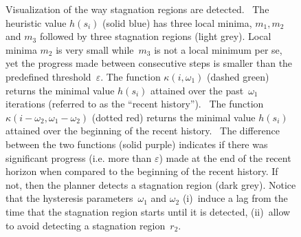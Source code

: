 \documentclass[conference]{IEEEtran}
\begin{document}
\begin{figure}[t]
{  }
  \caption{%
    Visualization of the way stagnation regions are detected.   
	~The heuristic value $h(s_i)$ (solid blue) has three local minima, $m_1, m_2$ and $m_3$ followed by three stagnation regions (light grey). Local minima $m_2$ is very small while~$m_3$ is not a local minimum per se, yet the progress made between consecutive steps is smaller than the predefined threshold~$\varepsilon$.
	The function $\kappa(i,\omega_1)$ (dashed green) returns the minimal value $h(s_i)$ attained over the past~$\omega_1$ iterations (referred to  as the ``recent history'').
    ~The function $\kappa(i-\omega_2,\omega_1-\omega_2)$ (dotted red) returns the minimal value $h(s_i)$ attained over the beginning of the recent history.
    ~The difference between the two functions (solid purple) indicates if there was significant progress (i.e. more than $\varepsilon$) made at the end of the recent horizon when compared to the beginning of the recent history. 
    If not, then the planner detects a stagnation region (dark grey).
		Notice that the hysteresis parameters~$\omega_1$ and $\omega_2$ 
		(i)~induce a lag from the time that the stagnation region starts until it is detected,
		(ii)~allow to avoid detecting a stagnation region~$r_2$.  
		}%

  \label{fig:filmstrip-local-min}%

  \vspace{-2.5mm}

\end{figure}





\end{document}
